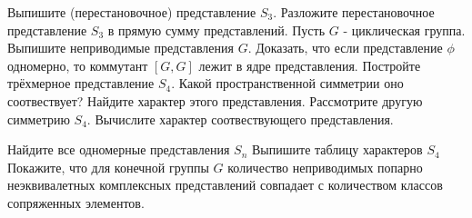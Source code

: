 \documentclass[12pt]{article}
\begin{document}
	\p
	Выпишите (перестановочное) представление $S_3$.
	\ep
	\p
	Разложите перестановочное представление $S_3$ в прямую сумму представлений.
	\ep
	\p 
	Пусть $G$ - циклическая группа. Выпишите неприводимые представления $G$.
	\ep
	\p 
	Доказать, что если представление $\phi$ одномерно, то коммутант $[G,G]$ лежит в ядре представления.
	\ep
	\p
	Постройте трёхмерное представление $S_4$. Какой пространственной симметрии оно соотвествует? Найдите характер этого представления.
	\ep
	\p Рассмотрите другую симметрию $S_4$. Вычислите характер соотвествующего представления.
	\ep

	
	\p Найдите все одномерные представления $S_n$
	\ep
	\p Выпишите таблицу характеров $S_4$
	\ep
	\p Покажите, что для конечной группы $G$ количество неприводимых попарно неэквивалетных комплексных представлений совпадает с количеством классов сопряженных элементов.	
	\ep


	
\end{document}
